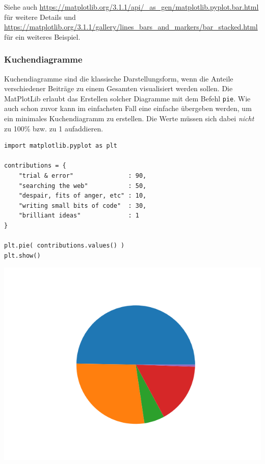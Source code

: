 Siehe auch \url{https://matplotlib.org/3.1.1/api/_as_gen/matplotlib.pyplot.bar.html} für weitere Details und \url{https://matplotlib.org/3.1.1/gallery/lines_bars_and_markers/bar_stacked.html} für ein weiteres Beispiel.

\subsubsection{Kuchendiagramme}
Kuchendiagramme sind die klassische Darstellungsform, wenn die Anteile verschiedener Beiträge zu einem Gesamten visualisiert werden sollen. Die MatPlotLib erlaubt das Erstellen solcher Diagramme mit dem Befehl \texttt{pie}. Wie auch schon zuvor kann im einfachsten Fall eine einfache  übergeben werden, um ein minimales Kuchendiagramm zu erstellen. Die Werte müssen sich dabei \emph{nicht} zu 100\% bzw. zu 1 aufaddieren.

\begin{codebox}[Beispiel: Einfaches Kuchendiagramm, width=.55\linewidth, nobeforeafter, equal height group = grpXmpSimplePie]
\begin{verbatim}
import matplotlib.pyplot as plt

contributions = {
    "trial & error"               : 90,
    "searching the web"           : 50,
    "despair, fits of anger, etc" : 10,
    "writing small bits of code"  : 30,
    "brilliant ideas"             : 1
}

plt.pie( contributions.values() )
plt.show()
\end{verbatim}
\end{codebox}
%
\begin{tcolorbox}[title=Ausgabe: Einfaches Kuchendiagramm, width=.45\linewidth, nobeforeafter, equal height group = grpXmpSimplePie]
	\includegraphics[width=\linewidth]{./gfx/plt-pie-simple}
\end{tcolorbox}

